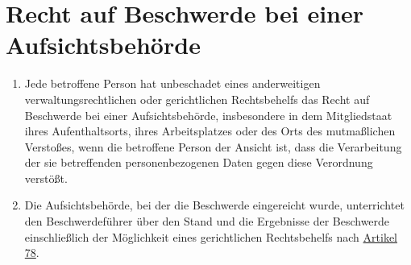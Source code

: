 \chapter{Recht auf Beschwerde bei einer Aufsichtsbehörde}
\label{ch:77}


\begin{enumerate}

  \item Jede betroffene Person hat unbeschadet eines anderweitigen verwaltungsrechtlichen oder gerichtlichen
   Rechtsbehelfs das Recht auf Beschwerde bei einer Aufsichtsbehörde, insbesondere in dem Mitgliedstaat ihres
   Aufenthaltsorts, ihres Arbeitsplatzes oder des Orts des mutmaßlichen Verstoßes, wenn die betroffene Person der
   Ansicht ist, dass die Verarbeitung der sie betreffenden personenbezogenen Daten gegen diese Verordnung verstößt.
  \label{itm:77-1}

  \item Die Aufsichtsbehörde, bei der die Beschwerde eingereicht wurde, unterrichtet den Beschwerdeführer über den Stand
   und die Ergebnisse der Beschwerde einschließlich der Möglichkeit eines gerichtlichen Rechtsbehelfs nach \hyperref
   [ch:78]{Artikel 78}.
  \label{itm:77-2}

\end{enumerate}


